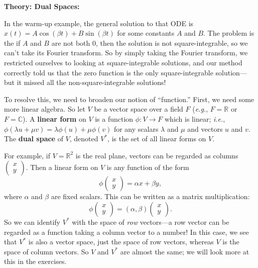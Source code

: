 \documentclass{article}
\begin{document}
\clearpage












\textbf{Theory: Dual Spaces:}\bigskip


In the warm-up example, the general solution to that ODE is $x(t)=A\cos(\beta t)+B \sin(\beta t)$ for some constants $A$ and $B$. The problem is the if $A$ and $B$ are not both 0, then the solution is not square-integrable, so we can't take its Fourier transform. So by simply taking the Fourier transform, we restricted ourselves to looking at square-integrable solutions, and our method correctly told us that the zero function is the only square-integrable solution---but it missed all the non-square-integrable solutions!

To resolve this, we need to broaden our notion of ``function.'' First, we need some more linear algebra. So let $V$ be a vector space over a field $F$ (\textit{e.g.}, $F=\mathbb{R}$ or $F=\mathbb{C}$). A \textbf{linear form} on $V$ is a function $\phi:V\to F$ which is linear; \textit{i.e.}, $\phi(\lambda u + \mu v) = \lambda\phi(u)+\mu\phi(v)$ for any scalars $\lambda$ and $\mu$ and vectors $u$ and $v$. The \textbf{dual space} of $V$, denoted $V^*$, is the set of all linear forms on $V$.

For example, if $V=\mathbb{R}^2$ is the real plane, vectors can be regarded as columns $\left(\begin{array}{c} x\\y\end{array}\right)$. Then a linear form on $V$ is any function of the form
\[\phi\left(\begin{array}{c}x\\y\end{array}\right)=\alpha x + \beta y,\]
where $\alpha$ and $\beta$ are fixed scalars. This can be written as a matrix multiplication:
\[\phi\left(\begin{array}{c}x\\y\end{array}\right)=\left(\alpha, \beta\right)\left(\begin{array}{c}x\\y\end{array}\right).\]
So we can identify $V^*$ with the space of \textit{row} vectors---a row vector can be regarded as a function taking a column vector to a number! In this case, we see that $V^*$ is also a vector space, just the space of row vectors, whereas $V$ is the space of column vectors. So $V$ and $V^*$ are almost the same; we will look more at this in the exercises.\medskip
\end{document}
